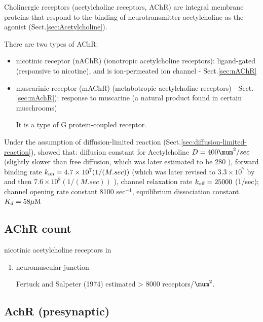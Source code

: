 Cholinergic receptors (acetylcholine receptors, AChR) are integral membrane
proteins that respond to the binding of neurotransmitter acetylcholine as
the agonist (Sect.\ref{sec:Acetylcholine}).

There are two types of AChR:
\begin{itemize}
  
  \item nicotinic receptor (nAChR) (ionotropic acetylcholine receptors):
  ligand-gated (responsive to  nicotine), and is ion-permeated ion channel -
  Sect.\ref{sec:nAChR}
  
  
  \item muscarinic receptor (mAChR) (metabotropic acetylcholine receptors) -
  Sect.\ref{sec:mAchR}):  response to muscarine (a natural product found in
  certain muschrooms)
  
  It is a type of G  protein-coupled receptor.
\end{itemize}


Under the assumption of diffusion-limited reaction
(Sect.\ref{sec:diffusion-limited-reaction}), \citep{land1981} showed that:
diffusion constant for Acetylcholine $D=400\mum^2/sec$ (slightly slower than
free diffusion, which was later estimated to be 280 \citep{madsen1987}), forward
binding rate $k_{\text{on}} = 4.7\times 10^7 (1/(M.sec))$ (which was later revised to
$3.3\times 10^7$ by \citep{land1984} and then $7.6\times 10^8 (1/(M.sec))$
\citep{madsen1987}), channel relaxation rate $k_{\text{off}} = 25000$ (1/sec); channel
opening rate constant 8100 sec$^{-1}$, equilibrium dissociation constant $K_d=58
{\mu\text{M}}$
\citep{madsen1987}

\subsection{AChR count}
\label{sec:AChR-count-per-synapse}

nicotinic acetylcholine receptors in 
\begin{enumerate}
  \item  neuromuscular junction 
  
  Fertuck and Salpeter (1974) estimated > 8000 receptors/$\mum^2$.
\end{enumerate}


\subsection{AchR (presynaptic)}
\label{sec:acetylcholine-receptor-presynaptic}
\label{sec:cholinergic-receptor-presynaptic}



